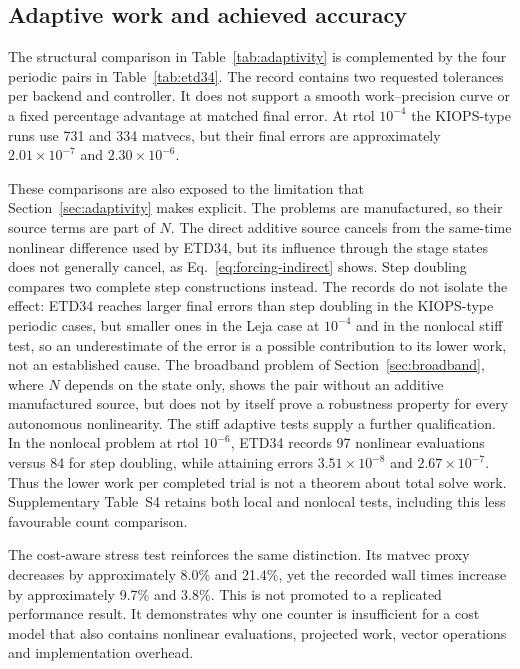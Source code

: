 \subsection{Adaptive work and achieved accuracy}\label{sec:adaptivework}

The structural comparison in Table~\ref{tab:adaptivity} is complemented by
the four periodic pairs in Table~\ref{tab:etd34}.  The record contains two
requested tolerances per backend and controller.  It does not support a smooth
work--precision curve or a fixed percentage advantage at matched final error.
At rtol $10^{-4}$ the KIOPS-type runs use 731 and 334 matvecs, but their final
errors are approximately $2.01\times10^{-7}$ and $2.30\times10^{-6}$.


These comparisons are also exposed to the limitation that
Section~\ref{sec:adaptivity} makes explicit.  The problems are manufactured,
so their source terms are part of $N$.  The direct additive source
cancels from the same-time nonlinear difference used by ETD34, but its
influence through the stage states does not generally cancel, as
Eq.~\eqref{eq:forcing-indirect} shows.  Step doubling compares two complete
step constructions instead.  The records do not isolate the effect: ETD34
reaches larger final errors than step doubling in the KIOPS-type periodic
cases, but smaller ones in the Leja case at $10^{-4}$ and in the nonlocal stiff
test, so an underestimate of the error is a possible contribution to its lower
work, not an established cause.  The broadband problem of
Section~\ref{sec:broadband}, where $N$ depends on the state only, shows the
pair without an additive manufactured source, but does not by itself
prove a robustness property for every autonomous nonlinearity.  The stiff adaptive tests supply a further
qualification.  In the nonlocal problem at rtol $10^{-6}$,
ETD34 records 97 nonlinear evaluations versus 84 for step doubling, while
attaining errors $3.51\times10^{-8}$ and $2.67\times10^{-7}$.  Thus the lower
work per completed trial is not a theorem about total solve work.
Supplementary Table~S4 retains both local and nonlocal tests, including this
less favourable count comparison.

The cost-aware stress test reinforces the same distinction.  Its matvec proxy
decreases by approximately 8.0\% and 21.4\%, yet the recorded wall times
increase by approximately 9.7\% and 3.8\%.  This is not promoted to a
replicated performance result.  It demonstrates why one counter is insufficient
for a cost model that also contains nonlinear evaluations, projected work,
vector operations and implementation overhead.

